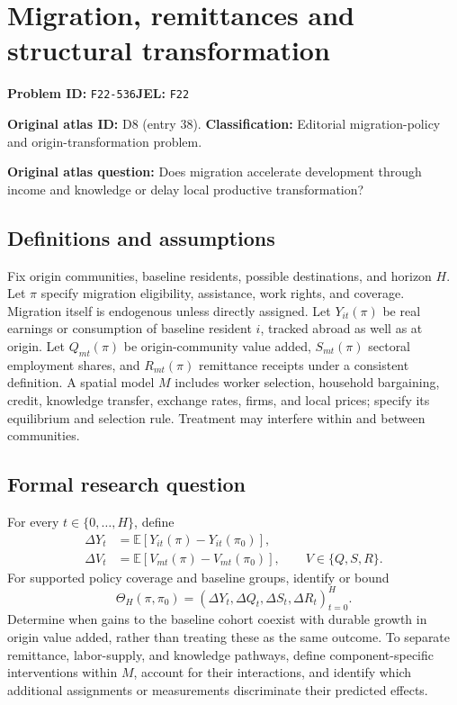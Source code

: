 \documentclass[11pt,a4paper]{article}
\begin{document}
\section*{Migration, remittances and structural transformation}
\textbf{Problem ID:} \texttt{F22-536}\quad \textbf{JEL:} \texttt{F22}\par
\label{problem:OP-0038}
\label{atlas:prob:D8}
\noindent\textbf{Original atlas ID:} D8 (entry 38). \textbf{Classification:} Editorial migration-policy and origin-transformation problem.

\noindent\textbf{Original atlas question:} Does migration accelerate development through income and knowledge or delay local productive transformation?

\subsection*{Definitions and assumptions}
Fix origin communities, baseline residents, possible destinations, and horizon $H$. Let $\pi$ specify migration eligibility, assistance, work rights, and coverage. Migration itself is endogenous unless directly assigned. Let $Y_{it}(\pi)$ be real earnings or consumption of baseline resident $i$, tracked abroad as well as at origin. Let $Q_{mt}(\pi)$ be origin-community value added, $S_{mt}(\pi)$ sectoral employment shares, and $R_{mt}(\pi)$ remittance receipts under a consistent definition. A spatial model $M$ includes worker selection, household bargaining, credit, knowledge transfer, exchange rates, firms, and local prices; specify its equilibrium and selection rule. Treatment may interfere within and between communities.
\subsection*{Formal research question}
For every $t\in\{0,\ldots,H\}$, define
\begin{align*}
 \Delta Y_t&=\mathbb E[Y_{it}(\pi)-Y_{it}(\pi_0)],\\
 \Delta V_t&=\mathbb E[V_{mt}(\pi)-V_{mt}(\pi_0)],
                  \qquad V\in\{Q,S,R\}.
\end{align*}
For supported policy coverage and baseline groups, identify or bound
\[
 \Theta_H(\pi,\pi_0)
    =(\Delta Y_t,\Delta Q_t,\Delta S_t,\Delta R_t)_{t=0}^H.
\]
Determine when gains to the baseline cohort coexist with durable growth in origin value added, rather than treating these as the same outcome. To separate remittance, labor-supply, and knowledge pathways, define component-specific interventions within $M$, account for their interactions, and identify which additional assignments or measurements discriminate their predicted effects.
\end{document}
